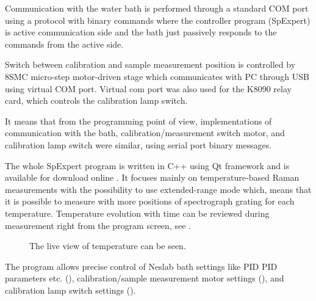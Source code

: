 Communication with the water bath is performed through a standard COM port
using a protocol with binary commands where the controller program (SpExpert)
is active communication side and the bath just passively responds to the
commands from the active side.

Switch between calibration and sample measurement position is controlled by
8SMC micro-step motor-driven stage which communicates with PC through USB
using virtual COM port.
Virtual com port was also used for the K8090 relay card, which controls the
calibration lamp switch.

It means that from the programming point of view, implementations of
communication with the bath, calibration/measurement switch motor, and
calibration lamp switch were similar, using serial port binary messages.

The whole SpExpert program is written in C++ using Qt framework
\parencite{Qt}
and is available for download online
\parencite{SpExpert2018}.
It focuses mainly on temperature-based Raman measurements with the possibility
to use extended-range mode which, means that it is possible to measure with
more positions of spectrograph grating for each temperature.
Temperature evolution with time can be reviewed during measurement right
from the program screen, see
.

\begin{figure}
	\centering
	\caption[%
			SpExpert program during temperature-dependent measurement.
	]{%
		The live view of temperature can be seen.}
	\label{\figlabel{spex_automation:temperature_measurement}}
\end{figure}

The program allows precise control of Neslab bath settings like PID
PID parameters etc.
(),
calibration/sample measurement motor settings
(),
and calibration lamp switch settings
().

\begin{figure}
	\centering
	\caption[%
		Settings of Neslab bath available from the SpExpert program.
	]{%
		}
	\label{\figlabel{spex_automation:neslabus}}
\end{figure}

